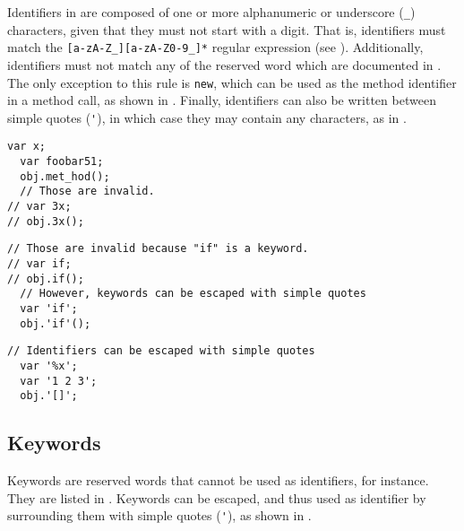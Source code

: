 \documentclass[openright,twoside,12pt]{report}
\begin{document}
Identifiers in \us are composed of one or more alphanumeric or
underscore (\lstinline|_|) characters, given that they must not start
with a digit. That is, identifiers must match the
\lstinline|[a-zA-Z_][a-zA-Z0-9_]*| regular expression (see
).  Additionally, identifiers must not match any of
the \us reserved word which are documented in . The only
exception to this rule is \lstinline|new|, which can be used as the
method identifier in a method call, as shown in
.  Finally, identifiers can also be written
between simple quotes (\lstinline|'|), in which case they may contain
any characters, as in .

\begin{lstlisting}[caption=Identifiers,label=lst:identifiers,float=\floatpos]
  var x;
  var foobar51;
  obj.met_hod();
  // Those are invalid.
// var 3x;
// obj.3x();
\end{lstlisting}

\begin{lstlisting}[caption=Identifiers cannot be keywords,
  label=lst:identifiers-keywords,float=\floatpos]
  // Those are invalid because "if" is a keyword.
// var if;
// obj.if();
  // However, keywords can be escaped with simple quotes
  var 'if';
  obj.'if'();
\end{lstlisting}

\begin{lstlisting}[caption=Escaping identifiers with simple quotes,
  label=lst:escape-identifiers,float=\floatpos]
  // Identifiers can be escaped with simple quotes
  var '%x';
  var '1 2 3';
  obj.'[]';
\end{lstlisting}

\subsection{Keywords}
\label{sect:syn-key}

Keywords are reserved words that cannot be used as identifiers, for
instance.  They are listed in .  Keywords can be
escaped, and thus used as identifier by surrounding them with simple
quotes (\lstinline|'|), as shown in .
\end{document}
